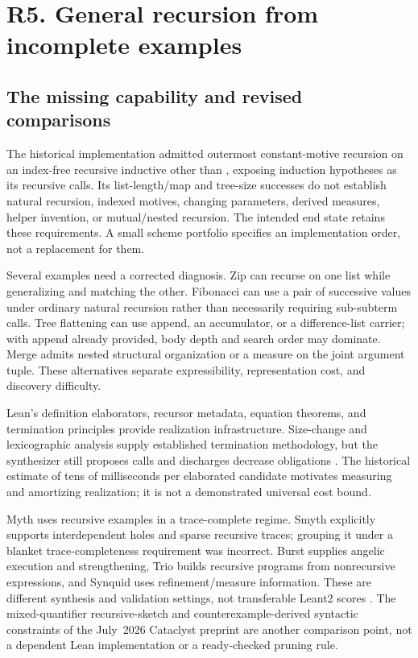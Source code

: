 \section{R5. General recursion from incomplete examples}\label{sec:recursion}

\subsection{The missing capability and revised comparisons}\label{sec:recursion-scope}

The historical implementation admitted outermost constant-motive recursion on
an index-free recursive inductive other than , exposing induction
hypotheses as its recursive calls. Its list-length/map and tree-size successes
do not establish natural recursion, indexed motives, changing parameters,
derived measures, helper invention, or mutual/nested recursion. The intended
end state retains these requirements. A small scheme portfolio specifies an
implementation order, not a replacement for them.

Several examples need a corrected diagnosis. Zip can recurse on one list while
generalizing and matching the other. Fibonacci can use a pair of successive
values under ordinary natural recursion rather than necessarily requiring
sub-subterm calls. Tree flattening can use append, an accumulator, or a
difference-list carrier; with append already provided, body depth and search
order may dominate. Merge admits nested structural organization or a measure
on the joint argument tuple. These alternatives separate expressibility,
representation cost, and discovery difficulty.

Lean's definition elaborators, recursor metadata, equation theorems, and
termination principles provide realization infrastructure. Size-change and
lexicographic analysis supply established termination methodology, but the
synthesizer still proposes calls and discharges decrease obligations
\cite{sizechange}. The historical estimate of tens of milliseconds per
elaborated candidate motivates measuring and amortizing realization; it is
not a demonstrated universal cost bound.

Myth uses recursive examples in a trace-complete regime. Smyth explicitly
supports interdependent holes and sparse recursive traces; grouping it under
a blanket trace-completeness requirement was incorrect. Burst supplies angelic
execution and strengthening, Trio builds recursive programs from nonrecursive
expressions, and Synquid uses refinement/measure information. These are
different synthesis and validation settings, not transferable Leant2 scores
\cite{myth,smyth,burst,trio,synquid}. The mixed-quantifier recursive-sketch and
counterexample-derived syntactic constraints of the July~2026 Cataclyst
preprint are another comparison point, not a dependent Lean implementation
or a ready-checked pruning rule.\cite{cataclyst}


